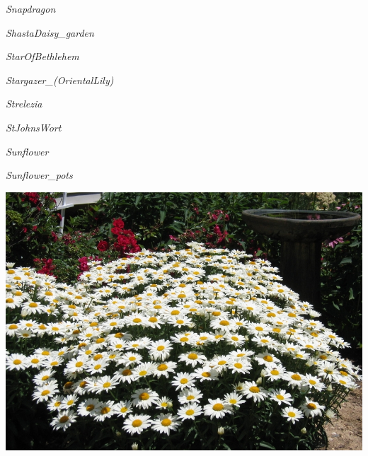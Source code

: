 \documentclass{article}
\begin{document}
\noindent
\vfill
\centerline{{\Large\emph{Snapdragon}}}
\vfill
\newpage

\noindent
\vfill
\centerline{{\Large\emph{ShastaDaisy_garden}}}
\vfill
\newpage

\noindent
\vfill
\centerline{{\Large\emph{StarOfBethlehem}}}
\vfill
\newpage

\noindent
\vfill
\centerline{{\Large\emph{Stargazer_(OrientalLily)}}}
\vfill
\newpage

\noindent
\vfill
\centerline{{\Large\emph{Strelezia}}}
\vfill
\newpage

\noindent
\vfill
\centerline{{\Large\emph{StJohnsWort}}}
\vfill
\newpage

\noindent
\vfill
\centerline{{\Large\emph{Sunflower}}}
\vfill
\newpage

\noindent
\vfill
\centerline{{\Large\emph{Sunflower_pots}}}
\vfill
\newpage

\begin{center}
\includegraphics[height=0.9\textheight, angle=90]{../ShastaDaisy_garden.jpg}
\end{center}
\newpage
\end{document}
